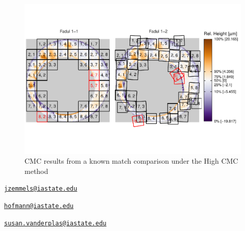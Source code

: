 \begin{Schunk}
\begin{figure}[htbp]

{\centering \includegraphics[width=1.2\textwidth,trim={0 2.5cm 0 2cm}]{cmcR_files/figure-latex/unnamed-chunk-14-1} 

}

\caption{\label{fig:highCMCPlot} CMC results from a known match comparison under the High CMC method}\label{fig:unnamed-chunk-14}
\end{figure}
\end{Schunk}




\address{%
Joseph Zemmels\\
Iowa State University Department of Statistics\\
2438 Osborn Dr\\ Ames, IA 50011\\
}
\href{mailto:jzemmels@iastate.edu}{\nolinkurl{jzemmels@iastate.edu}}

\address{%
Heike Hofmann\\
Iowa State University Department of Statistics\\
2438 Osborn Dr\\ Ames, IA 50011\\
}
\href{mailto:hofmann@iastate.edu}{\nolinkurl{hofmann@iastate.edu}}

\address{%
Susan VanderPlas\\
University of Nebraska - Lincoln Department of Statistics\\
340 Hardin Hall North Wing\\ Lincoln, NE 68583\\
}
\href{mailto:susan.vanderplas@iastate.edu}{\nolinkurl{susan.vanderplas@iastate.edu}}

